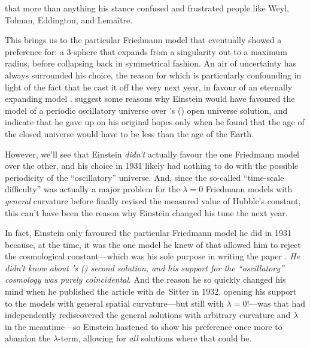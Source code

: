 \documentclass[12 pt]{article}
\def\citeapos#1{\citeauthor{#1}'s (\citeyear{#1})}
\begin{document}
{}  that more than anything his stance confused and frustrated people like Weyl, Tolman, Eddington, and Lema\^{i}tre.

This brings us to the particular Friedmann model that \citet{Einstein1931a} eventually showed a preference for: a 3-sphere that expands from a singularity out to a maximum radius, before collapsing back in symmetrical fashion. An air of uncertainty has always surrounded his choice, the reason for which is particularly confounding in light of the fact that he cast it off the very next year, in favour of an eternally expanding model \citep{Einstein1932}. \citet[p.~177]{Steinhardt2007} suggest some reasons why Einstein would have favoured the model of a periodic oscillatory universe over \citeapos{Friedmann1924} open universe solution, and indicate that he gave up on his original hopes only when he found that the age of the closed universe would have to be less than the age of the Earth. 

However, we'll see that Einstein \textit{didn't} actually favour the one Friedmann model over the other, and his choice in 1931 likely had nothing to do with the possible periodicity of the ``oscillatory'' universe. And, since the so-called ``time-scale difficulty'' \citep{Bondi1960} was actually a major problem for the $\lambda=0$ Friedmann models with \textit{general} curvature before \citet{Sandage1958} finally revised the measured value of Hubble's constant, this can't have been the reason why Einstein changed his tune the next year. 

In fact, Einstein only favoured the particular Friedmann model he did in 1931 because, at the time, it was the one model he knew of that allowed him to reject the cosmological constant---which was his sole purpose in writing the paper \citep{Einstein1931b}. \textit{He didn't know about \citeapos{Friedmann1924} second solution, and his support for the ``oscillatory'' cosmology was purely coincidental}. And the reason he so quickly changed his mind when he published the article with de~Sitter in 1932, opening his support to the models with general spatial curvature---but still with $\lambda=0$!---was that \textit{\citet{Heckmann1931}} had independently rediscovered the general solutions with arbitrary curvature and $\lambda$ in the meantime---so Einstein hastened to show his preference once more to abandon the $\lambda$-term, allowing for \textit{all} solutions where that could be. 
\end{document}
